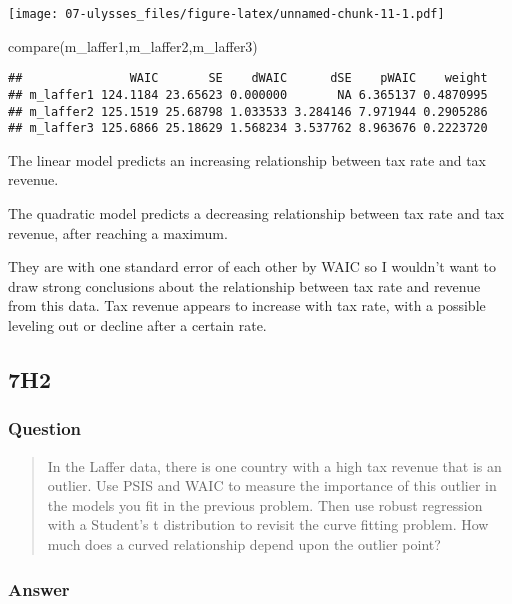 \documentclass[
]{book}
\newenvironment{Shaded}{\begin{snugshade}}{\end{snugshade}}
\newcommand{\FunctionTok}[1]{\textcolor[rgb]{0.00,0.00,0.00}{#1}}
\newcommand{\NormalTok}[1]{#1}
\begin{document}
\texttt{[image: 07-ulysses\_files/figure-latex/unnamed-chunk-11-1.pdf]}

\begin{Shaded}
\begin{Highlighting}[]
\FunctionTok{compare}\NormalTok{(m\_laffer1,m\_laffer2,m\_laffer3)}
\end{Highlighting}
\end{Shaded}

\begin{verbatim}
##               WAIC       SE    dWAIC      dSE    pWAIC    weight
## m_laffer1 124.1184 23.65623 0.000000       NA 6.365137 0.4870995
## m_laffer2 125.1519 25.68798 1.033533 3.284146 7.971944 0.2905286
## m_laffer3 125.6866 25.18629 1.568234 3.537762 8.963676 0.2223720
\end{verbatim}

The linear model predicts an increasing relationship between tax rate and tax revenue.

The quadratic model predicts a decreasing relationship between tax rate and tax revenue, after reaching a maximum.

They are with one standard error of each other by WAIC so I wouldn't want to draw strong conclusions about the relationship between tax rate and revenue from this data. Tax revenue appears to increase with tax rate, with a possible leveling out or decline after a certain rate.

\hypertarget{h2-3}{%
\subsection*{7H2}\label{h2-3}}

\hypertarget{question-71}{%
\subsubsection*{Question}\label{question-71}}

\begin{quote}
In the Laffer data, there is one country with a high tax revenue that is an outlier. Use PSIS and WAIC to measure the importance of this outlier in the models you fit in the previous problem. Then use robust regression with a Student's t distribution to revisit the curve fitting problem. How much does a curved relationship depend upon the outlier point?
\end{quote}

\hypertarget{answer-71}{%
\subsubsection*{Answer}\label{answer-71}}
\end{document}
